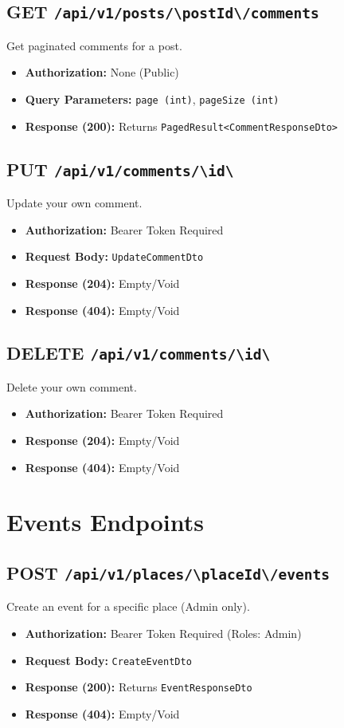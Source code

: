 \subsection{GET \texttt{/api/v1/posts/\textbackslash{}{postId\textbackslash{}}/comments}}
Get paginated comments for a post.
\begin{itemize}
    \item \textbf{Authorization:} None (Public)
    \item \textbf{Query Parameters:} \texttt{page (int)}, \texttt{pageSize (int)}
    \item \textbf{Response (200):} Returns \texttt{PagedResult<CommentResponseDto>}
\end{itemize}

\subsection{PUT \texttt{/api/v1/comments/\textbackslash{}{id\textbackslash{}}}}
Update your own comment.
\begin{itemize}
    \item \textbf{Authorization:} Bearer Token Required
    \item \textbf{Request Body:} \texttt{UpdateCommentDto}
    \item \textbf{Response (204):} Empty/Void
    \item \textbf{Response (404):} Empty/Void
\end{itemize}

\subsection{DELETE \texttt{/api/v1/comments/\textbackslash{}{id\textbackslash{}}}}
Delete your own comment.
\begin{itemize}
    \item \textbf{Authorization:} Bearer Token Required
    \item \textbf{Response (204):} Empty/Void
    \item \textbf{Response (404):} Empty/Void
\end{itemize}

\section{Events Endpoints}

\subsection{POST \texttt{/api/v1/places/\textbackslash{}{placeId\textbackslash{}}/events}}
Create an event for a specific place (Admin only).
\begin{itemize}
    \item \textbf{Authorization:} Bearer Token Required (Roles: Admin)
    \item \textbf{Request Body:} \texttt{CreateEventDto}
    \item \textbf{Response (200):} Returns \texttt{EventResponseDto}
    \item \textbf{Response (404):} Empty/Void
\end{itemize}

